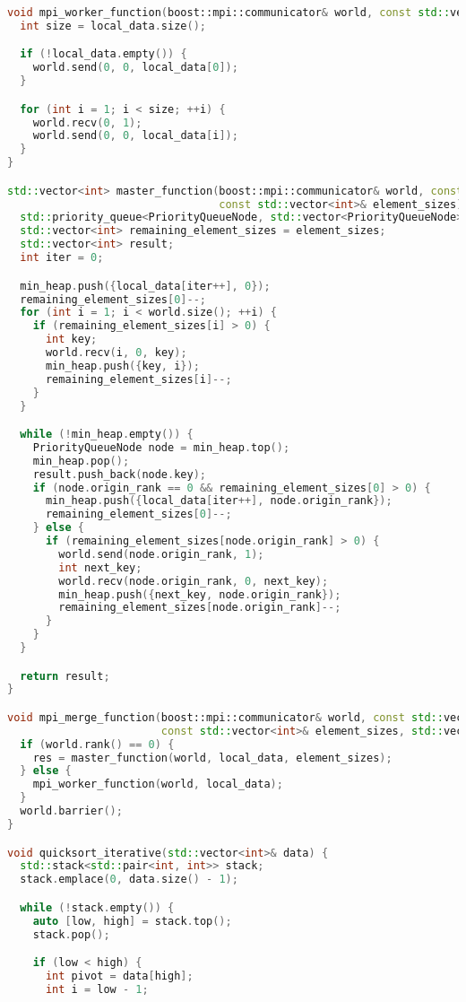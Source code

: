 \documentclass[a4paper,12pt]{article}
\begin{document}
\begin{lstlisting}[language=C++,caption={Код программы}]
void mpi_worker_function(boost::mpi::communicator& world, const std::vector<int>& local_data) {
  int size = local_data.size();

  if (!local_data.empty()) {
    world.send(0, 0, local_data[0]);
  }

  for (int i = 1; i < size; ++i) {
    world.recv(0, 1);
    world.send(0, 0, local_data[i]);
  }
}

std::vector<int> master_function(boost::mpi::communicator& world, const std::vector<int>& local_data,
                                 const std::vector<int>& element_sizes) {
  std::priority_queue<PriorityQueueNode, std::vector<PriorityQueueNode>, std::greater<>> min_heap;
  std::vector<int> remaining_element_sizes = element_sizes;
  std::vector<int> result;
  int iter = 0;

  min_heap.push({local_data[iter++], 0});
  remaining_element_sizes[0]--;
  for (int i = 1; i < world.size(); ++i) {
    if (remaining_element_sizes[i] > 0) {
      int key;
      world.recv(i, 0, key);
      min_heap.push({key, i});
      remaining_element_sizes[i]--;
    }
  }

  while (!min_heap.empty()) {
    PriorityQueueNode node = min_heap.top();
    min_heap.pop();
    result.push_back(node.key);
    if (node.origin_rank == 0 && remaining_element_sizes[0] > 0) {
      min_heap.push({local_data[iter++], node.origin_rank});
      remaining_element_sizes[0]--;
    } else {
      if (remaining_element_sizes[node.origin_rank] > 0) {
        world.send(node.origin_rank, 1);
        int next_key;
        world.recv(node.origin_rank, 0, next_key);
        min_heap.push({next_key, node.origin_rank});
        remaining_element_sizes[node.origin_rank]--;
      }
    }
  }

  return result;
}

void mpi_merge_function(boost::mpi::communicator& world, const std::vector<int>& local_data,
                        const std::vector<int>& element_sizes, std::vector<int>& res) {
  if (world.rank() == 0) {
    res = master_function(world, local_data, element_sizes);
  } else {
    mpi_worker_function(world, local_data);
  }
  world.barrier();
}

void quicksort_iterative(std::vector<int>& data) {
  std::stack<std::pair<int, int>> stack;
  stack.emplace(0, data.size() - 1);

  while (!stack.empty()) {
    auto [low, high] = stack.top();
    stack.pop();

    if (low < high) {
      int pivot = data[high];
      int i = low - 1;


\end{lstlisting}
\end{document}
